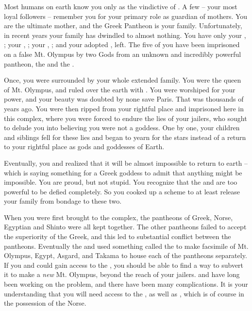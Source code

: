 \documentclass[char]{guardians}
\begin{document}
\name{\cHera{}}

Most humans on earth know you only as the vindictive \cHera{\spouse} of \cZeus{}. A few -- your most loyal followers -- remember you for your primary role as guardian of mothers. You are the ultimate mother, and the Greek Pantheon is your family. Unfortunately, in recent years your family has dwindled to almost nothing. You have only your \cZeus{\spouse}, \cZeus{}; your \cAthena{\offspring}, \cAthena{}; your \cHephaestus{\offspring}, \cHephaestus{}; and your adopted \cPandora{\offspring}, \cPandora{} left. The five of you have been imprisoned on a false Mt. Olympus by two Gods from an unknown and incredibly powerful pantheon, the \cWarden{} and the \cCaretaker{}.

Once, you were surrounded by your whole extended family. You were the queen of Mt. Olympus, and ruled over the earth with \cZeus{}. You were worshiped for your power, and your beauty was doubted by none save Paris. That was thousands of years ago. You were then ripped from your rightful place and imprisoned here in this complex, where you were forced to endure the lies of your jailers, who sought to delude you into believing you were not a goddess. One by one, your children and siblings fell for these lies and began to yearn for the stars instead of a return to your rightful place as gods and goddesses of Earth.

Eventually, you and \cZeus{} realized that it will be almost impossible to return to earth -- which is saying something for a Greek goddess to admit that anything might be impossible. You are proud, but not stupid. You recognize that the \cWarden{} and \cCaretaker{} are too powerful to be defied completely. So you cooked up a scheme to at least release your family from bondage to these two.

When you were first brought to the complex, the pantheons of Greek, Norse, Egyptian and Shinto were all kept together. The other pantheons failed to accept the superiority of the Greek, and this led to substantial conflict between the pantheons. Eventually the \cCaretaker{} and \cWarden{} used something called the \stone to make facsimile of Mt. Olympus, Egypt, Asgard, and Takama to house each of the pantheons separately. If you and \cZeus{} could gain access to the \stone, you should be able to find a way to subvert it to make a \emph{new} Mt. Olympus, beyond the reach of your jailers.  \cZeus{} and \cHephaestus{} have long been working on the problem, and there have been many complications. It is your understanding that you will need access to the \stone, as well as \iHammer{\MYname}, which is of course in the possession of the Norse.



\begin{itemz}[Goals]
  \item 
\end{itemz}


\begin{contacts}
  \contact{}
\end{contacts}
\end{document}
